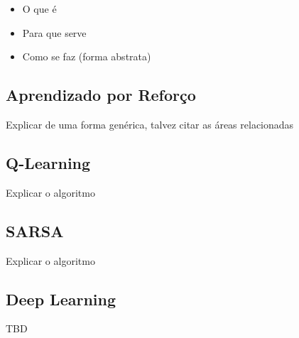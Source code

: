 \begin{itemize} \item O que é \item Para que serve \item Como se faz (forma
abstrata) \end{itemize}

\subsection{Aprendizado por Reforço}

Explicar de uma forma genérica, talvez citar as áreas relacionadas

\subsection{Q-Learning}

Explicar o algoritmo

\subsection{SARSA}

Explicar o algoritmo

\subsection{Deep Learning}

TBD

